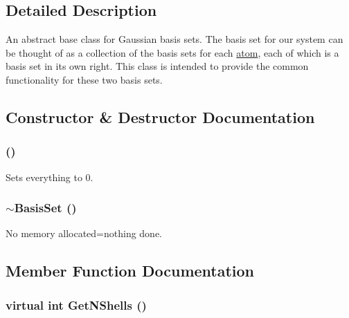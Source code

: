 \subsection{Detailed Description}
An abstract base class for Gaussian basis sets. The basis set for our system can be thought of as a collection of the basis sets for each \hyperlink{classJKBuilder_1_1atom}{atom}, each of which is a basis set in its own right. This class is intended to provide the common functionality for these two basis sets. 

\subsection{Constructor \& Destructor Documentation}
\hypertarget{classJKBuilder_1_1BasisSet_a902600fb65d5c4d7f7041316b1845b07}{
\subsubsection[{BasisSet}]{ ()}}
\label{classJKBuilder_1_1BasisSet_a902600fb65d5c4d7f7041316b1845b07}


Sets everything to 0. \hypertarget{classJKBuilder_1_1BasisSet_acd6bebfe86051930ab0931d7d2486cce}{
\subsubsection[{$\sim$BasisSet}]{\setlength{\rightskip}{0pt plus 5cm}$\sim${\bf BasisSet} ()}}
\label{classJKBuilder_1_1BasisSet_acd6bebfe86051930ab0931d7d2486cce}


No memory allocated=nothing done. 

\subsection{Member Function Documentation}
\hypertarget{classJKBuilder_1_1BasisSet_a0eb3b46d258dffcfbc3e4db91f60f4f8}{
\subsubsection[{GetNShells}]{\setlength{\rightskip}{0pt plus 5cm}virtual int GetNShells ()}}
\label{classJKBuilder_1_1BasisSet_a0eb3b46d258dffcfbc3e4db91f60f4f8}


